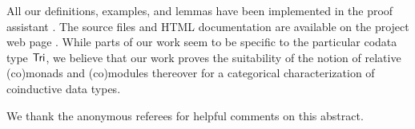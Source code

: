 \documentclass{llncs}
\begin{document}
 All our definitions, examples, and lemmas have been implemented in the proof assistant \coq. %
 The \coq source files and HTML documentation are available on the project web page \parencite{trimat_coq}.
 While parts of our work seem to be specific to the particular codata type $\mathsf{Tri}$,
 we believe that our work proves the suitability of the notion of relative (co)monads and (co)modules thereover for 
 a categorical characterization of coinductive data types.


 
We thank the anonymous referees for helpful comments on this abstract.

\renewcommand*{\bibfont}{\small}
\printbibliography[heading=none]
\end{document}
